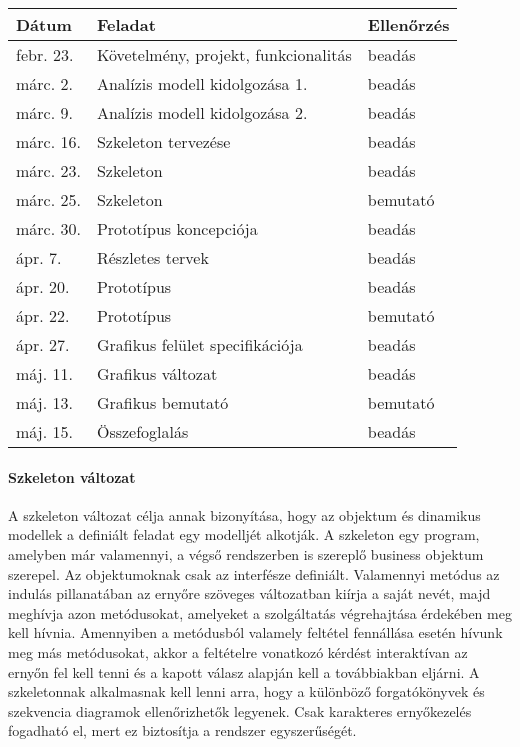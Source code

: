 \begin{center}
	\begin{tabular}{ | l | l | l | }
		\hline
		\textbf{Dátum} &
		\textbf{Feladat} &
		\textbf{Ellenőrzés}
		
		\\ \hline \hline
		febr. 23. & Követelmény, projekt, funkcionalitás & beadás
		\\ \hline 
		márc. 2. &	Analízis modell kidolgozása 1. & beadás
		\\ \hline 
		márc. 9. &	Analízis modell kidolgozása 2. & beadás
		\\ \hline 
		márc. 16. &	Szkeleton tervezése & beadás
		\\ \hline 		
		márc. 23. &	Szkeleton & beadás
		\\ \hline
		márc. 25. & Szkeleton & bemutató
		\\ \hline 
		márc. 30. &	Prototípus koncepciója & beadás
		\\ \hline 
		ápr. 7.	 & Részletes tervek & beadás
		\\ \hline 
		ápr. 20. &	Prototípus & beadás
		\\ \hline 
		ápr. 22. & Prototípus & bemutató
		\\ \hline
		ápr. 27. &	Grafikus felület specifikációja & beadás
		\\ \hline 	 
		máj. 11. &	Grafikus változat & beadás
		\\ \hline
		máj. 13. & Grafikus bemutató & bemutató
		\\ \hline
		máj. 15. &	Összefoglalás & beadás
		\\ \hline 
	\end{tabular}
\end{center}

\paragraph{Szkeleton változat} A szkeleton változat célja annak bizonyítása, hogy az objektum és dinamikus modellek a definiált feladat egy modelljét alkotják. A szkeleton egy program, amelyben már valamennyi, a végső rendszerben is szereplő business objektum szerepel. Az objektumoknak csak az interfésze definiált. Valamennyi metódus az indulás pillanatában az ernyőre szöveges változatban kiírja a saját nevét, majd meghívja azon metódusokat, amelyeket a szolgáltatás végrehajtása érdekében meg kell hívnia. Amennyiben a metódusból valamely feltétel fennállása esetén hívunk meg más metódusokat, akkor a feltételre vonatkozó kérdést interaktívan az ernyőn fel kell tenni és a kapott válasz alapján kell a továbbiakban eljárni. A szkeletonnak alkalmasnak kell lenni arra, hogy a különböző forgatókönyvek és szekvencia diagramok ellenőrizhetők legyenek. Csak karakteres ernyőkezelés fogadható el, mert ez biztosítja a rendszer egyszerűségét.

